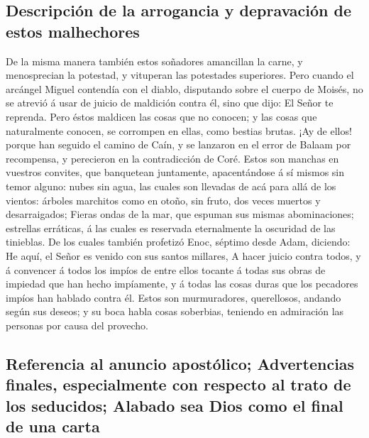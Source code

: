 \hypertarget{descripciuxf3n-de-la-arrogancia-y-depravaciuxf3n-de-estos-malhechores}{%
\subsection{Descripción de la arrogancia y depravación de estos
malhechores}\label{descripciuxf3n-de-la-arrogancia-y-depravaciuxf3n-de-estos-malhechores}}

 De la misma manera también estos soñadores amancillan la
carne, y menosprecian la potestad, y vituperan las potestades
superiores.  Pero cuando el arcángel Miguel contendía con
el diablo, disputando sobre el cuerpo de Moisés, no se atrevió á usar de
juicio de maldición contra él, sino que dijo: El Señor te reprenda.
 Pero éstos maldicen las cosas que no conocen; y las
cosas que naturalmente conocen, se corrompen en ellas, como bestias
brutas.  ¡Ay de ellos! porque han seguido el camino de
Caín, y se lanzaron en el error de Balaam por recompensa, y perecieron
en la contradicción de Coré.  Estos son manchas en
vuestros convites, que banquetean juntamente, apacentándose á sí mismos
sin temor alguno: nubes sin agua, las cuales son llevadas de acá para
allá de los vientos: árboles marchitos como en otoño, sin fruto, dos
veces muertos y desarraigados;  Fieras ondas de la mar,
que espuman sus mismas abominaciones; estrellas erráticas, á las cuales
es reservada eternalmente la oscuridad de las tinieblas. 
De los cuales también profetizó Enoc, séptimo desde Adam, diciendo: He
aquí, el Señor es venido con sus santos millares,  A
hacer juicio contra todos, y á convencer á todos los impíos de entre
ellos tocante á todas sus obras de impiedad que han hecho impíamente, y
á todas las cosas duras que los pecadores impíos han hablado contra él.
 Estos son murmuradores, querellosos, andando según sus
deseos; y su boca habla cosas soberbias, teniendo en admiración las
personas por causa del provecho.

\hypertarget{referencia-al-anuncio-apostuxf3lico-advertencias-finales-especialmente-con-respecto-al-trato-de-los-seducidos-alabado-sea-dios-como-el-final-de-una-carta}{%
\subsection{Referencia al anuncio apostólico; Advertencias finales,
especialmente con respecto al trato de los seducidos; Alabado sea Dios
como el final de una
carta}\label{referencia-al-anuncio-apostuxf3lico-advertencias-finales-especialmente-con-respecto-al-trato-de-los-seducidos-alabado-sea-dios-como-el-final-de-una-carta}}


